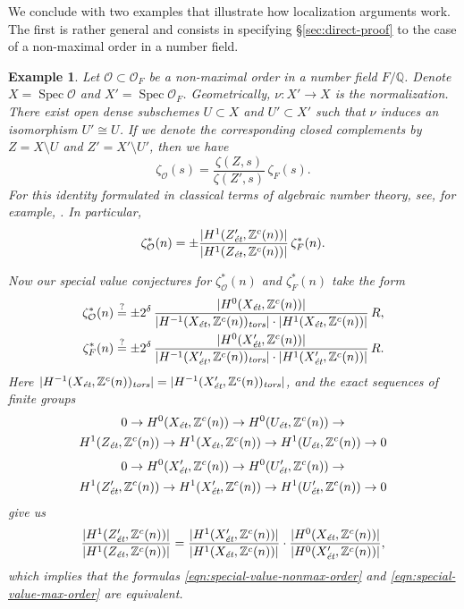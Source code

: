\documentclass[draft]{article}
\DeclareMathOperator{\Spec}{Spec}
\newcommand{\QQ}{\mathbb{Q}}
\newcommand{\ZZ}{\mathbb{Z}}
\newcommand{\et}{\text{\it \'{e}t}}
\newcommand{\tors}{\text{\it tors}}
\theoremstyle{myplain}
\theoremstyle{mydefinition}
\newtheorem{example}[theorem]{Example}
\begin{document}
We conclude with two examples that illustrate how localization arguments
work. The first is rather general and consists in specifying
\S\ref{sec:direct-proof} to the case of a non-maximal order in a number field.

\begin{example}
  Let $\mathcal{O} \subset \mathcal{O}_F$ be a non-maximal order in a number
  field $F/\QQ$. Denote $X = \Spec \mathcal{O}$ and
  $X' = \Spec \mathcal{O}_F$. Geometrically, $\nu\colon X' \to X$ is the
  normalization. There exist open dense subschemes $U \subset X$ and
  $U' \subset X'$ such that $\nu$ induces an isomorphism $U' \cong U$. If we
  denote the corresponding closed complements by $Z = X\setminus U$ and
  $Z' = X'\setminus U'$, then we have
  $$\zeta_\mathcal{O} (s) = \frac{\zeta (Z,s)}{\zeta (Z',s)}\,\zeta_F (s).$$
  For this identity formulated in classical terms of algebraic number theory,
  see, for example, \cite{Jenner-1969}. In particular,
  \[ \zeta^*_\mathcal{O} (n) =
    \pm \frac{|H^1 (Z'_\et, \ZZ^c(n))|}{|H^1 (Z_\et, \ZZ^c(n))|}\,\zeta^*_F (n). \]

  Now our special value conjectures for $\zeta^*_\mathcal{O} (n)$ and
  $\zeta^*_F (n)$ take the form
  \begin{align}
    \label{eqn:special-value-nonmax-order}
    \zeta^*_\mathcal{O} (n) & \stackrel{?}{=}
                              \pm 2^\delta\,\frac{|H^0 (X_\et, \ZZ^c (n))|}{|H^{-1} (X_\et, \ZZ^c (n))_\tors|\cdot |H^1 (X_\et, \ZZ^c (n))|}\,R, \\
    \label{eqn:special-value-max-order}
    \zeta^*_F (n) & \stackrel{?}{=}
                    \pm 2^\delta\,\frac{|H^0 (X'_\et, \ZZ^c (n))|}{|H^{-1} (X'_\et, \ZZ^c (n))_\tors|\cdot |H^1 (X'_\et, \ZZ^c (n))|}\,R.
  \end{align}
  Here
  $|H^{-1} (X_\et, \ZZ^c (n))_\tors| = |H^{-1} (X'_\et, \ZZ^c (n))_\tors|$, and
  the exact sequences of finite groups
  \begin{multline*}
    0 \to H^0 (X_\et, \ZZ^c (n)) \to H^0 (U_\et, \ZZ^c (n)) \to \\
    H^1 (Z_\et, \ZZ^c (n)) \to H^1 (X_\et, \ZZ^c (n)) \to H^1 (U_\et, \ZZ^c (n)) \to 0
  \end{multline*}
  \begin{multline*}
    0 \to H^0 (X'_\et, \ZZ^c (n)) \to H^0 (U'_\et, \ZZ^c (n)) \to \\
    H^1 (Z'_\et, \ZZ^c (n)) \to H^1 (X'_\et, \ZZ^c (n)) \to H^1 (U'_\et, \ZZ^c (n)) \to 0
  \end{multline*}
  give us
  \[ \frac{|H^1 (Z'_\et, \ZZ^c (n))|}{|H^1 (Z_\et, \ZZ^c (n))|} =
    \frac{|H^1 (X'_\et, \ZZ^c (n))|}{|H^1 (X_\et, \ZZ^c (n))|}\cdot
    \frac{|H^0 (X_\et, \ZZ^c (n))|}{|H^0 (X'_\et, \ZZ^c (n))|}, \]
  which implies that the formulas \eqref{eqn:special-value-nonmax-order} and
  \eqref{eqn:special-value-max-order} are equivalent.
\end{example}
\end{document}
